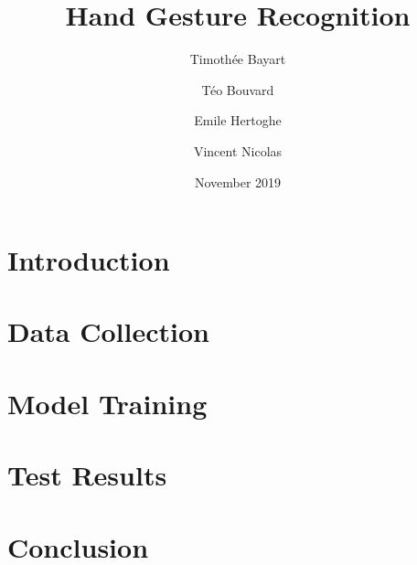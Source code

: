\documentclass{article}
\title{\textbf{Hand Gesture Recognition}}
\author{Timoth\'ee Bayart \and T\'eo Bouvard \and Emile Hertoghe \and Vincent Nicolas}
\date{November 2019}
\begin{document}
\maketitle

\begin{abstract}

\end{abstract}

\section{Introduction}

\section{Data Collection}

\section{Model Training}

\section{Test Results}

\section{Conclusion}


\bigskip




\end{document}

